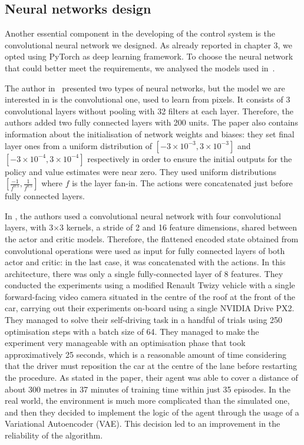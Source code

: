 \subsection{Neural networks design}

Another essential component in the developing of the control system is the convolutional neural network we designed.
As already reported in chapter 3, we opted using PyTorch as deep learning framework.
To choose the neural network that could better meet the requirements, we analysed the models used in~\cite{lillicrap2015continuous,kendall2018learning,haarnoja2018soft, haarnoja2018alg}.

The author in~\cite{lillicrap2015continuous} presented two types of neural networks, but the model we are interested in is the convolutional one, used to learn from pixels.
It consists of 3 convolutional layers without pooling with 32 filters at each layer.
Therefore, the authors added two fully connected layers with 200 units.
The paper also contains information about the initialisation of network weights and biases: they set final layer ones from a uniform distribution of $[-3\times 10^{-3},3\times 10^{-3}]$ and $[-3\times 10^{-4},3\times 10^{-4}]$ respectively in order to ensure the initial outputs for the policy and value estimates were near zero.
They used uniform distributions $[\frac{-1}{f^{0.5}}, \frac{1}{f^{0.5}}]$ where $f$ is the layer fan-in.
The actions were concatenated just before fully connected layers.

In \cite{kendall2018learning}, the authors used a convolutional neural network with four convolutional layers, with 3$\times$3 kernels, a stride of 2 and 16 feature dimensions, shared between the actor and critic models.
Therefore, the flattened encoded state obtained from convolutional operations were used as input for fully connected layers of both actor and critic: in the last case, it was concatenated with the actions.
In this architecture, there was only a single fully-connected layer of 8 features.
They conducted the experiments using a modified Renault Twizy vehicle with a single forward-facing video camera situated in the centre of the roof at the front of the car, carrying out their experiments on-board using a single NVIDIA Drive PX2.
They managed to solve their self-driving task in a handful of trials using 250 optimisation steps with a batch size of 64.
They managed to make the experiment very manageable with an optimisation phase that took approximatively 25 seconds, which is a reasonable amount of time considering that the driver must reposition the car at the centre of the lane before restarting the procedure.
As stated in the paper, their agent was able to cover a distance of about 300 metres in 37 minutes of training time within just 35 episodes.
In the real world, the environment is much more complicated than the simulated one, and then they decided to implement the logic of the agent through the usage of a Variational Autoencoder (VAE).
This decision led to an improvement in the reliability of the algorithm.

